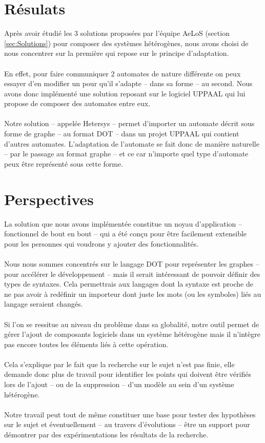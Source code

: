 \documentclass[12pt,a4paper]{report}
\begin{document}
\section{Résulats}
Après avoir étudié les 3 solutions proposées par l'équipe AeLoS (section \ref{sec:Solutions}) pour composer des systèmes hétérogènes, 
nous avons choisi de nous concentrer sur la première qui repose sur le principe d'adaptation.
\\\\
En effet, pour faire communiquer 2 automates de nature différente on peux essayer d'en modifier un 
pour qu'il s'adapte -- dans sa forme -- au second. Nous avons donc implémenté une solution reposant sur 
le logiciel UPPAAL qui lui propose de composer des automates entre eux.
\\\\
Notre solution -- appelée Hetersys -- permet d'importer un automate décrit sous forme de graphe -- au format DOT --
dans un projet UPPAAL qui contient d'autres automates. L'adaptation de l'automate se fait donc de manière naturelle
-- par le passage au format graphe -- et ce car n'importe quel type d'automate peux être représenté sous cette forme.

\section{Perspectives}
La solution que nous avons implémentée constitue un noyau d'application -- fonctionnel de bout en bout -- qui a été conçu 
pour être facilement extensible pour les personnes qui voudrons y ajouter des fonctionnalités. 
\\\\
Nous nous sommes concentrés sur
le langage DOT pour représenter les graphes -- pour accélérer le développement -- mais il serait intéressant de pouvoir définir des types de syntaxes.
Cela permettrais aux langages dont la syntaxe est proche de ne pas avoir à redéfinir un importeur dont juste les mots (ou les symboles)
liés au langage seraient changés. 
\\\\
Si l'on se ressitue au niveau du problème dans sa globalité, notre outil permet de gérer l'ajout de composants logiciels
dans un système hétérogène mais il n'intègre pas encore toutes les éléments liés à cette opération. 
\\\\
Cela s'explique par le fait que la recherche sur le sujet n'est pas finie, elle demande donc plus de travail pour identifier
les points qui doivent être vérifiés lors de l'ajout -- ou de la suppression -- d'un modèle au sein d'un système hétérogène.
\\\\
Notre travail peut tout de même constituer une base pour tester des hypothèses sur le sujet et éventuellement  -- au travers
d'évolutions -- être un support pour démontrer par des expérimentations les résultats de la recherche.
\end{document}
